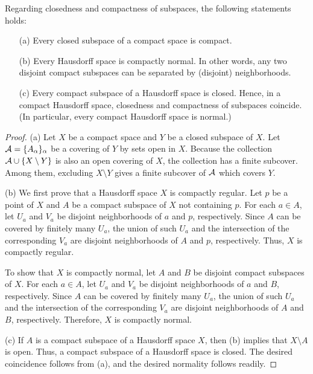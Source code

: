 \begin{thm}
    Regarding closedness and compactness of subspaces, the following statements holds:
    \begin{enumerate}
        \item[(a)]
        {
            Every closed subspace of a compact space is compact.
        }
        \item[(b)]
        {
            Every Hausdorff space is compactly normal.
            In other words, any two disjoint compact subspaces can be separated by (disjoint) neighborhoods.
        }
        \item[(c)]
        {
            Every compact subspace of a Hausdorff space is closed.
            Hence, in a compact Hausdorff space, closedness and compactness of subspaces coincide.
            (In particular, every compact Hausdorff space is normal.)
        }
    \end{enumerate}
\end{thm}
\begin{proof}
    \hangindent=0.65cm
    \noindent(a)
    Let $X$ be a compact space and $Y$ be a closed subspace of $X$.
    Let ${\mathcal{A}}=\{A_\alpha\}_\alpha$ be a covering of $Y$ by sets open in $X$.
    Because the collection ${\mathcal{A}}\cup\{X\setminus Y\}$ is also an open covering of $X$, the collection has a finite subcover.
    Among them, excluding $X\setminus Y$ gives a finite subcover of ${\mathcal{A}}$ which covers $Y$.

    \noindent(b)
    We first prove that a Hausdorff space $X$ is compactly regular.
    Let $p$ be a point of $X$ and $A$ be a compact subspace of $X$ not containing $p$.
    For each $a\in A$, let $U_a$ and $V_a$ be disjoint neighborhoods of $a$ and $p$, respectively.
    Since $A$ can be covered by finitely many $U_a$, the union of such $U_a$ and the intersection of the corresponding $V_a$ are disjoint neighborhoods of $A$ and $p$, respectively.
    Thus, $X$ is compactly regular.

    To show that $X$ is compactly normal, let $A$ and $B$ be disjoint compact subspaces of $X$.
    For each $a\in A$, let $U_a$ and $V_a$ be disjoint neighborhoods of $a$ and $B$, respectively.
    Since $A$ can be covered by finitely many $U_a$, the union of such $U_a$ and the intersection of the corresponding $V_a$ are disjoint neighborhoods of $A$ and $B$, respectively.
    Therefore, $X$ is compactly normal.
    
    \noindent(c)
    If $A$ is a compact subspace of a Hausdorff space $X$, then (b) implies that $X\setminus A$ is open.
    Thus, a compact subspace of a Hausdorff space is closed.
    The desired coincidence follows from (a), and the desired normality follows readily.
\end{proof}

